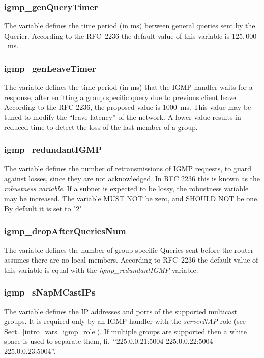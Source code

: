 \documentclass[a4paper,11pt,titlepage]{report}
\begin{document}
\subsubsection{igmp\_genQueryTimer}
The variable defines the time period (in ms) between general queries sent by the Querier. According to the RFC~2236 the default value of this variable is $125,000$~ms.

\subsubsection{igmp\_genLeaveTimer}
The variable defines the time period (in ms) that the IGMP handler waits for a response, after emitting a group specific query due to previous client leave. According to the RFC 2236, the proposed value is $1000$~ms. This value may be tuned to modify the ``leave latency'' of the network. A lower value results in reduced time to detect the loss of the last member of a group.

\subsubsection{igmp\_redundantIGMP}
The variable defines the number of retransmissions of IGMP requests, to guard against losses, since they are not acknowledged. In RFC 2236 this is known as the \textit{robustness variable}.  If a subnet is expected to be lossy, the robustness variable may be increased. The variable MUST NOT be zero, and SHOULD NOT be one. By default it is set to "2".

\subsubsection{igmp\_dropAfterQueriesNum}
The variable defines the number of group specific Queries sent before the router assumes there are no local members. According to RFC~2236 the default value of this variable is equal with the \textit{igmp\_redundantIGMP} variable.

\subsubsection{igmp\_sNapMCastIPs}
The variable defines the IP addresses and ports of the supported multicast groups. It is required only by an IGMP handler with the \textit{serverNAP} role (see Sect.~\ref{intro_vars_igmp_role}). If multiple groups are supported then a white space is used to separate them, fi.~``225.0.0.21:5004 225.0.0.22:5004 225.0.0.23:5004''.
\end{document}
